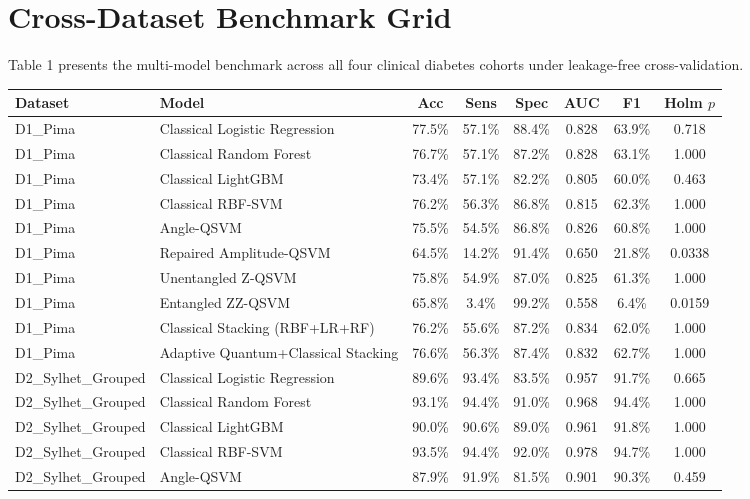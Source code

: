 \documentclass[10pt,twocolumn]{article}
\begin{document}
\section{Cross-Dataset Benchmark Grid}
Table 1 presents the multi-model benchmark across all four clinical diabetes cohorts under leakage-free cross-validation.

\begin{table}[t]
\centering
\small
\begin{tabular}{llcccccc}
\toprule
\textbf{Dataset} & \textbf{Model} & \textbf{Acc} & \textbf{Sens} & \textbf{Spec} & \textbf{AUC} & \textbf{F1} & \textbf{Holm $p$} \\
\midrule
D1\_Pima & Classical Logistic Regression & 77.5\% & 57.1\% & 88.4\% & 0.828 & 63.9\% & 0.718 \\
D1\_Pima & Classical Random Forest & 76.7\% & 57.1\% & 87.2\% & 0.828 & 63.1\% & 1.000 \\
D1\_Pima & Classical LightGBM & 73.4\% & 57.1\% & 82.2\% & 0.805 & 60.0\% & 0.463 \\
D1\_Pima & Classical RBF-SVM & 76.2\% & 56.3\% & 86.8\% & 0.815 & 62.3\% & 1.000 \\
D1\_Pima & Angle-QSVM & 75.5\% & 54.5\% & 86.8\% & 0.826 & 60.8\% & 1.000 \\
D1\_Pima & Repaired Amplitude-QSVM & 64.5\% & 14.2\% & 91.4\% & 0.650 & 21.8\% & 0.0338 \\
D1\_Pima & Unentangled Z-QSVM & 75.8\% & 54.9\% & 87.0\% & 0.825 & 61.3\% & 1.000 \\
D1\_Pima & Entangled ZZ-QSVM & 65.8\% & 3.4\% & 99.2\% & 0.558 & 6.4\% & 0.0159 \\
D1\_Pima & Classical Stacking (RBF+LR+RF) & 76.2\% & 55.6\% & 87.2\% & 0.834 & 62.0\% & 1.000 \\
D1\_Pima & Adaptive Quantum+Classical Stacking & 76.6\% & 56.3\% & 87.4\% & 0.832 & 62.7\% & 1.000 \\
D2\_Sylhet\_Grouped & Classical Logistic Regression & 89.6\% & 93.4\% & 83.5\% & 0.957 & 91.7\% & 0.665 \\
D2\_Sylhet\_Grouped & Classical Random Forest & 93.1\% & 94.4\% & 91.0\% & 0.968 & 94.4\% & 1.000 \\
D2\_Sylhet\_Grouped & Classical LightGBM & 90.0\% & 90.6\% & 89.0\% & 0.961 & 91.8\% & 1.000 \\
D2\_Sylhet\_Grouped & Classical RBF-SVM & 93.5\% & 94.4\% & 92.0\% & 0.978 & 94.7\% & 1.000 \\
D2\_Sylhet\_Grouped & Angle-QSVM & 87.9\% & 91.9\% & 81.5\% & 0.901 & 90.3\% & 0.459 \\

\end{tabular}
\end{table}
\end{document}
